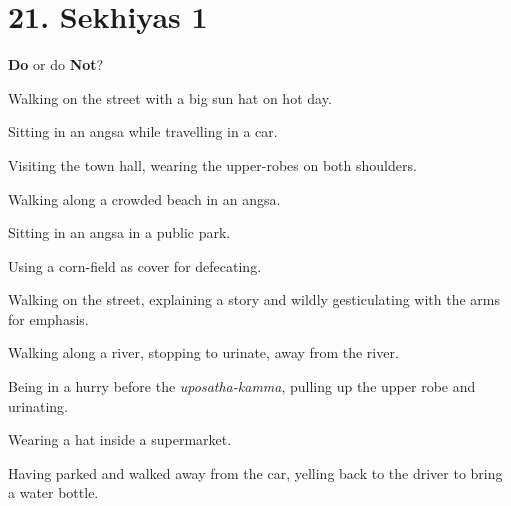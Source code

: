 \chapter{21. Sekhiyas 1}
\renewcommand*{\theChapterTitle}{21. Sekhiyas 1}

\begin{exam}{\autoExamName}

  \begin{problem*}
    \textbf{Do} or do \textbf{Not}?

    \bigskip

    \begin{parts}

    \item {} Walking on the street with a big sun hat on hot day.

    \bigskip

    \item {} Sitting in an angsa while travelling in a car.

    \bigskip

    \item {} Visiting the town hall, wearing the upper-robes on both shoulders.

    \bigskip

    \item {} Walking along a crowded beach in an angsa.

    \bigskip

    \item {} Sitting in an angsa in a public park.

    \bigskip

    \item {} Using a corn-field as cover for defecating.

    \bigskip

    \item {} Walking on the street, explaining a story and wildly gesticulating with the arms for emphasis.

    \bigskip

    \item {} Walking along a river, stopping to urinate, away from the river.

    \bigskip

    \item {} Being in a hurry before the \emph{uposatha-kamma}, pulling up the upper robe and urinating.

    \bigskip

    \item {} Wearing a hat inside a supermarket.

    \bigskip

    \item {} Having parked and walked away from the car, yelling back to the driver to bring a water bottle.

    \end{parts}

  \end{problem*}

\end{exam}
